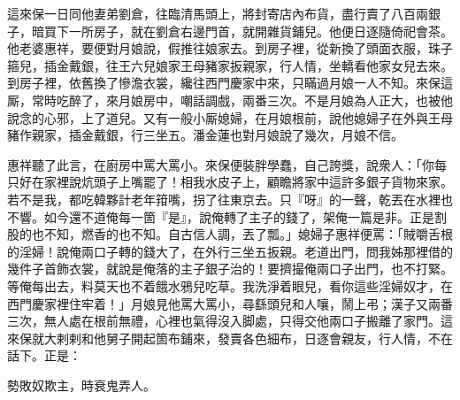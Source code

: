 這來保一日同他妻弟劉倉，往臨清馬頭上，將封寄店內布貨，盡行賣了八百兩銀子，暗買下一所房子，就在劉倉右邊門首，就開雜貨鋪兒。他便日逐隨倚祀會茶。他老婆惠祥，要便對月娘說，假推往娘家去。到房子裡，從新換了頭面衣服，珠子箍兒，插金戴銀，往王六兒娘家王母豬家扳親家，行人情，坐轎看他家女兒去來。到房子裡，依舊換了慘澹衣裳，纔往西門慶家中來，只瞞過月娘一人不知。來保這厮，常時吃醉了，來月娘房中，嘲話調戲，兩番三次。不是月娘為人正大，也被他說念的心邪，上了道兒。又有一般小厮媳婦，在月娘根前，說他媳婦子在外與王母豬作親家，插金戴銀，行三坐五。潘金蓮也對月娘說了幾次，月娘不信。

惠祥聽了此言，在廚房中罵大罵小。來保便裝胖學蠢，自己誇獎，說衆人：「你每只好在家裡說炕頭子上嘴罷了！相我水皮子上，顧瞻將家中這許多銀子貨物來家。若不是我，都吃韓夥計老年箝嘴，拐了往東京去。{}只『呀』的一聲，乾丟在水裡也不響。如今還不道俺每一箇『是』，說俺轉了主子的錢了，架俺一篇是非。正是割股的也不知，燃香的也不知。自古信人調，丟了瓢。」媳婦子惠祥便罵：「賊嚼舌根的淫婦！說俺兩口子轉的錢大了，在外行三坐五扳親。老道出門，問我姊那裡借的幾件子首飾衣裳，就說是俺落的主子銀子治的！要擠撮俺兩口子出門，也不打緊。{}等俺每出去，料莫天也不着餓水鴉兒吃草。我洗淨着眼兒，看你這些淫婦奴才，在西門慶家裡住牢着！」月娘見他罵大罵小，尋繇頭兒和人嚷，鬧上弔；漢子又兩番三次，無人處在根前無禮，心裡也氣得沒入脚處，只得交他兩口子搬離了家門。這來保就大剌剌和他舅子開起箇布鋪來，發賣各色細布，日逐會親友，行人情，不在話下。正是：

\begin{myquote}
勢敗奴欺主，時衰鬼弄人。
\end{myquote}

